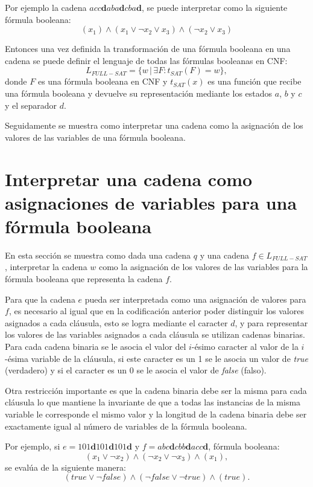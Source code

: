 Por ejemplo la cadena $acc\mathbf{d}aba\mathbf{d}cba\mathbf{d}$, se puede interpretar como la siguiente fórmula 
booleana:
$$(x_1)\wedge(x_1\vee \neg x_2 \vee x_3) \wedge (\neg x_2\vee x_3)$$

Entonces una vez definida la transformación de una fórmula booleana en una cadena se puede definir el lenguaje
de todas las fórmulas booleanas en CNF:
$$L_{FULL-SAT}=\{w\,|\,\exists F : t_{SAT}(F)=w\},$$
donde $F$ es una fórmula booleana en CNF y $t_{SAT}(x)$ es una función que recibe una fórmula booleana y devuelve
su representación mediante los estados $a$, $b$ y $c$ y el separador $d$.

Seguidamente se muestra como interpretar una cadena como la asignación de los valores de las variables de una fórmula
booleana.

\section{Interpretar una cadena como asignaciones de variables para una fórmula booleana}
\label{sec:intsat}

En esta sección se muestra como dada una cadena $q$ y una cadena $f\in L_{FULL-SAT}$, interpretar
la cadena $w$ como la asignación de los valores de las variables para la fórmula booleana que representa
la cadena $f$.

Para que la cadena $e$ pueda ser interpretada como una asignación de valores para $f$, es necesario al igual
que en la codificación anterior poder distinguir los valores asignados a cada cláusula, esto se logra mediante
el caracter $d$, y para representar los valores de las variables asignados a cada cláusula se utilizan
cadenas binarias. Para cada cadena binaria se le asocia el valor del $i$-ésimo caracter al valor de la $i$-ésima
variable de la cláusula, si este caracter es un 1 se le asocia un valor de \textit{true} (verdadero) y si el
caracter es un 0 se le asocia el valor de \textit{false} (falso).

Otra restricción importante es que la cadena
binaria debe ser la misma para cada cláusula lo que mantiene la invariante de que a todas las instancias de la misma
variable le corresponde el mismo valor y la longitud de la cadena binaria debe ser exactamente igual al número de
variables de la fórmula booleana.

Por ejemplo, si $e=101\mathbf{d}101\mathbf{d}101\mathbf{d}$ y $f=abc\mathbf{d}cbb\mathbf{d}acc\mathbf{d}$, fórmula booleana:
$$(x_1\vee\neg x_2)\wedge (\neg x_2 \vee \neg x_3)\wedge (x_1),$$
se evalúa de la siguiente manera:
$$(true\vee\neg false)\wedge (\neg false \vee \neg true)\wedge (true).$$

